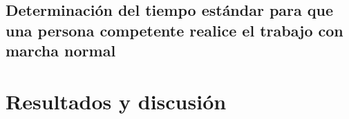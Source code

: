     \subsection{Determinación del tiempo estándar para que una persona competente realice el trabajo con marcha normal}
    
    
    
    
    
    
    
    \section{Resultados y discusión}
    
